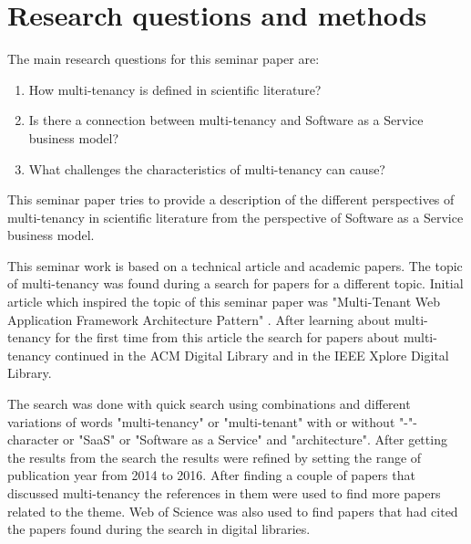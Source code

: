 \documentclass[conference]{sasmoota2017}
\begin{document}



\section{Research questions and methods}

The main research questions for this seminar paper are: 
\begin{enumerate}
\item How multi-tenancy is defined in scientific literature?
\item Is there a connection between multi-tenancy and Software as a Service business model?
\item What challenges the characteristics of multi-tenancy can cause?
\end{enumerate}
This seminar paper tries to provide a description of the different perspectives of multi-tenancy in scientific literature from the perspective of Software as a Service business model. 

This seminar work is based on a technical article and academic papers. The topic of multi-tenancy was found during a search for papers for a different topic. Initial article which inspired the topic of this seminar paper was "Multi-Tenant Web Application Framework Architecture Pattern" \cite{Bien:2015:MultiTenantWebApp}. After learning about multi-tenancy for the first time from this article the search for papers about multi-tenancy continued in the ACM Digital Library and in the IEEE Xplore Digital Library. 

The search was done with quick search using combinations and different variations of words "multi-tenancy" or "multi-tenant" with or without "-"-character or "SaaS" or "Software as a Service" and "architecture". After getting the results from the search the results were refined by setting the range of publication year from 2014 to 2016. After finding a couple of papers that discussed multi-tenancy the references in them were used to find more papers related to the theme. Web of Science was also used to find papers that had cited the papers found during the search in digital libraries.
\end{document}
